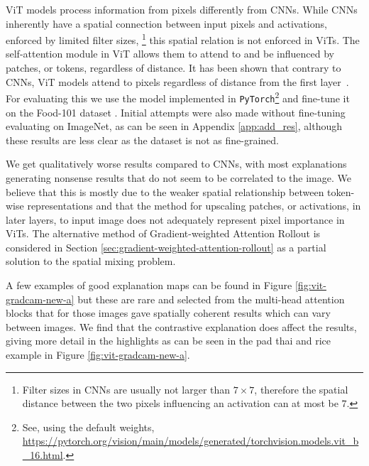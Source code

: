 ViT models process information from pixels differently from CNNs. While CNNs inherently have a spatial connection between input pixels and activations, enforced by limited filter sizes, \footnote{Filter sizes in CNNs are usually not larger than $7\times 7$, therefore the spatial distance between the two pixels influencing an activation can at most be $7$.} this spatial relation is not enforced in ViTs. The self-attention module in ViT allows them to attend to and be influenced by patches, or tokens, regardless of distance. It has been shown that contrary to CNNs, ViT models attend to pixels regardless of distance from the first layer~\cite{visual-transformer}. For evaluating this we use the model implemented in \texttt{PyTorch}\footnote{See, using the default weights, \href{https://pytorch.org/vision/main/models/generated/torchvision.models.vit_b_16.html}{https://pytorch.org/vision/main/models/generated/torchvision.models.vit\_b\_16.html}.} and fine-tune it on the Food-101 dataset \citep{food101}. Initial attempts were also made without fine-tuning evaluating on ImageNet, as can be seen in Appendix \ref{app:add_res}, although these results are less clear as the dataset is not as fine-grained.

We get qualitatively worse results compared to CNNs, with most explanations generating nonsense results that do not seem to be correlated to the image. We believe that this is mostly due to the weaker spatial relationship between token-wise representations and that the method for upscaling patches, or activations, in later layers, to input image does not adequately represent pixel importance in ViTs. The alternative method of Gradient-weighted Attention Rollout is considered in Section \ref{sec:gradient-weighted-attention-rollout} as a partial solution to the spatial mixing problem.


A few examples of good explanation maps can be found in Figure \ref{fig:vit-gradcam-new-a} but these are rare and selected from the multi-head attention blocks that for those images gave spatially coherent results which can vary between images. We find that the contrastive explanation does affect the results, giving more detail in the highlights as can be seen in the pad thai and rice example in Figure \ref{fig:vit-gradcam-new-a}. 


